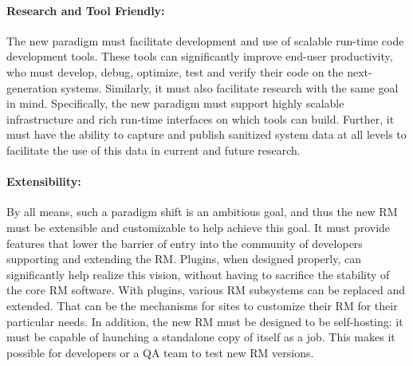 \documentclass{article}
\newcommand{\ngrm}{NGRM}
\begin{document}
\paragraph{Research and Tool Friendly:}
The new paradigm must facilitate development and use of 
scalable run-time code development tools. These tools can significantly 
improve end-user productivity, who must develop, debug, optimize, 
test and verify their code on the next-generation systems. 
Similarly, it must
also facilitate research with the same goal in mind.
Specifically, the new paradigm must support highly scalable infrastructure
and rich run-time interfaces
on which tools can build. Further, it must have 
the ability to capture and
publish sanitized system data at all levels to facilitate the use of
this data in current and future research. 


\paragraph{Extensibility:}
By all means, such a paradigm shift is an ambitious goal, and thus
the new RM must be extensible and customizable to help achieve this goal.
It must provide features that lower the barrier of entry into the
community of developers supporting and extending the RM.
Plugins, when designed properly, can significantly help realize this vision,
without having to sacrifice the stability of the core RM software. 
With plugins, various RM subsystems can be replaced and extended.  
That can be the mechanisms for
sites to customize their RM for their particular needs. 
In addition, the new RM must be designed to be self-hosting: it must  
be capable of launching a standalone copy of itself as a job. This makes
it possible for developers or a QA team to test new RM versions. 

%
\end{document}
